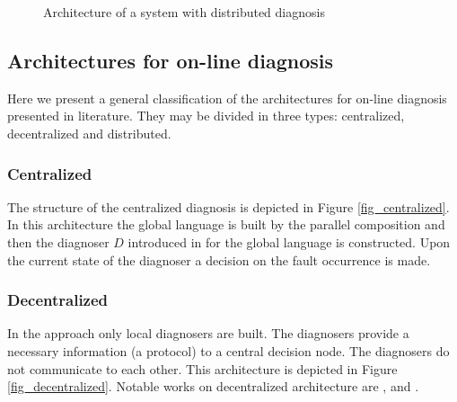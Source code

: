 \documentclass[a4paper, 10pt, conference]{ieeeconf}
\begin{document}
\begin{figure}[t]
\centering
{}
\caption{Architecture of a system with distributed diagnosis}
\label{fig_distributed}
\end{figure}   


\subsection{Architectures for on-line diagnosis}
Here we present a general classification of the
architectures for on-line diagnosis presented in literature. They may be divided
in three types: centralized, decentralized and distributed.

\subsubsection{Centralized}
The structure of the centralized diagnosis is depicted in
Figure \ref{fig_centralized}. In this architecture the global language is
built by the parallel composition and then the diagnoser $D$ introduced in
\cite{sampath_diagnosability_1995} for the global language is constructed. Upon
the current state of the diagnoser a decision on the fault occurrence is made.

\subsubsection{Decentralized}
In the approach only local diagnosers are built.
The diagnosers provide a necessary information (a protocol) to a central
decision node. The diagnosers do not communicate to each other. This
architecture is depicted in Figure \ref{fig_decentralized}.
Notable works on decentralized architecture are
\cite{debouk_coordinated_1998},
\cite{contant_diagnosability_2006} and \cite{wang_diagnosis_2007}.
\end{document}
